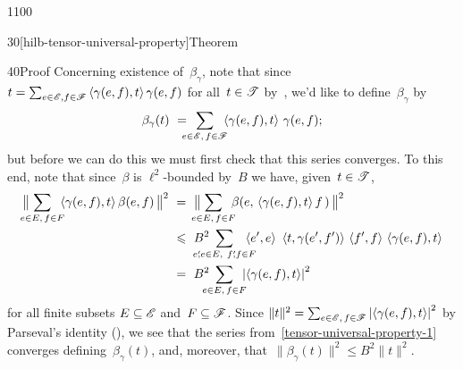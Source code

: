 \begin{parsec}{1100}
\begin{point}{30}[hilb-tensor-universal-property]{Theorem}
\begin{point}{40}{Proof}
Concerning existence of~$\beta_\gamma$,
note that
since $t=\sum_{e\in\mathscr{E},f\in\mathscr{F}} \left<\gamma(e,f),t\right>\gamma(e,f)$
for all~$t\in\mathscr{T}$
by~,
 we'd like to define~$\beta_\gamma$ by
\begin{equation}
	\label{tensor-universal-property-1}
	\beta_\gamma(t) \ =\  
	\hspace{-1em}
	\sum_{e\in\mathscr{E},\,f\in\mathscr{F}}
	\hspace{-.5em}
	\left<\gamma(e,f),t\right>\,\gamma(e,f);
\end{equation}
but before we can do this
we must first check that this series converges.
To this end,
note that since~$\beta$ is $\ell^2$-bounded by~$B$
we have, given~$t\in \mathscr{T}$,
\begin{alignat*}{3}
	\bigl\|\hspace{-.75em}\sum_{e\in E,\,f\in F}
	\hspace{-.5em}
\left< \gamma(e,f),t\right>\beta(e,f)
\,\bigr\|^2
\ &=\  
\bigl\|\hspace{-.75em}
\sum_{e\in E,\,f\in F}
\hspace{-.5em}
\beta(e,\,\left<\gamma(e,f),t\right>f\,)
\,\bigr\|^2
\\
\ &\leq \  
B^2\hspace{-1.5em}\sum_{e'\!\!,e\in E,\ f'\!\!,f\in F}
\hspace{-1em}
\left<e',e\right>\,
\,\left<t,\gamma(e',f')\right>\,
\left<f',f\right>\,\left<\gamma(e,f),t\right>
\\
\ &=\ 
B^2\hspace{-.75em}\sum_{e\in E,\,f\in F}
\hspace{-.5em}
\left|\left<\gamma(e,f),t\right>\right|^2
\end{alignat*}
for all finite subsets $E\subseteq\mathscr{E}$
and~$F\subseteq \mathscr{F}$.
Since $\|t\|^2=\sum_{e\in \mathscr{E},\,f\in\mathscr{F}}
\left|\left<\gamma(e,f),t\right>\right|^2$
by Parseval's identity (),
we see
that the series
from~\eqref{tensor-universal-property-1}
converges defining~$\beta_\gamma(t)$,
and, moreover,
that~$\|\beta_\gamma(t)\|^2\leq B^2\|t\|^2$.


\end{point}
\end{point}
\end{parsec}
